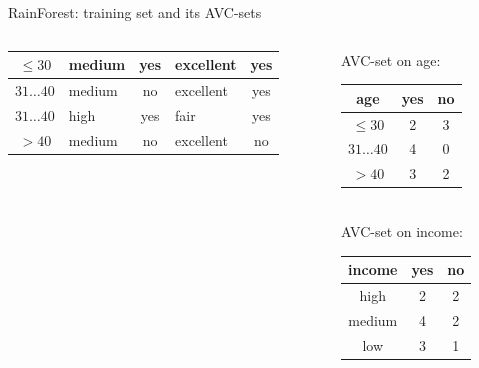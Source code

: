 \documentclass[aspectratio=169,t,table]{beamer}
\begin{document}
{\begin{frame}{RainForest: training set and its AVC-sets}
\begin{columns}
\begin{column}{0.6\textwidth}
\begin{tabular}{|c|l|c|l|c|}
            \cellcolor{yellow!20}$\leq30$ & \cellcolor{yellow!20}medium & \cellcolor{yellow!20}yes & \cellcolor{yellow!20}excellent & \cellcolor{green!20}yes \\\hline
            \cellcolor{yellow!20}$31\ldots40$ & \cellcolor{yellow!20}medium & \cellcolor{yellow!20}no & \cellcolor{yellow!20}excellent & \cellcolor{green!20}yes \\\hline
            \cellcolor{yellow!20}$31\ldots40$ & \cellcolor{yellow!20}high & \cellcolor{yellow!20}yes & \cellcolor{yellow!20}fair & \cellcolor{green!20}yes \\\hline
            \cellcolor{yellow!20}$>40$ & \cellcolor{yellow!20}medium & \cellcolor{yellow!20}no & \cellcolor{yellow!20}excellent & \cellcolor{red!20}no \\\hline
          \end{tabular}
        \end{column}
        \begin{column}{0.3\textwidth}
          \vspace{-3cm}

          \centering
          AVC-set on age:\\
          \begin{tabular}{|c|c|c|}
            \hline
            age & yes & no \\\hline
            $\leq 30$ & 2 & 3 \\\hline
            $31\ldots40$ & 4 & 0 \\\hline
            $>40$ & 3 & 2 \\\hline
          \end{tabular}\\[1cm]
          AVC-set on income:\\
          \begin{tabular}{|c|c|c|}
            \hline
            income & yes & no \\\hline
            high & 2 & 2 \\\hline
            medium & 4 & 2 \\\hline
            low & 3 & 1 \\\hline
          \end{tabular}
        \end{column}
      \end{columns}
    \end{frame}
  }
\end{document}
